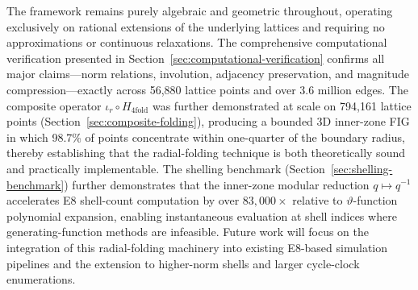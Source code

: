 \documentclass{article}
\begin{document}
The framework remains purely algebraic and geometric throughout, operating exclusively on rational extensions of the underlying lattices and requiring no approximations or continuous relaxations. The comprehensive computational verification presented in Section~\ref{sec:computational-verification} confirms all major claims---norm relations, involution, adjacency preservation, and magnitude compression---exactly across 56{,}880 lattice points and over 3.6 million edges. The composite operator $\iota_r \circ H_{4\mathrm{fold}}$ was further demonstrated at scale on 794{,}161 lattice points (Section~\ref{sec:composite-folding}), producing a bounded 3D inner-zone FIG in which 98.7\% of points concentrate within one-quarter of the boundary radius, thereby establishing that the radial-folding technique is both theoretically sound and practically implementable. The shelling benchmark (Section~\ref{sec:shelling-benchmark}) further demonstrates that the inner-zone modular reduction $q \mapsto q^{-1}$ accelerates E8 shell-count computation by over $83{,}000\times$ relative to $\vartheta$-function polynomial expansion, enabling instantaneous evaluation at shell indices where generating-function methods are infeasible. Future work will focus on the integration of this radial-folding machinery into existing E8-based simulation pipelines and the extension to higher-norm shells and larger cycle-clock enumerations.
\end{document}
